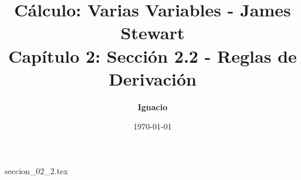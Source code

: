 \documentclass[11pt,spanish,oneside]{report}
\title{\textbf{Cálculo: Varias Variables - James Stewart} \\ \Large Capítulo 2: Sección 2.2 - Reglas de Derivación}
\author{\textbf{Ignacio}}
\date{\today}
\begin{document}
\maketitle

{seccion_02_2.tex}
\end{document}
